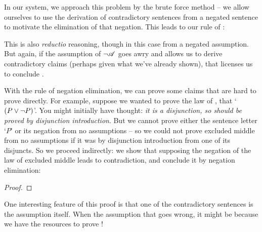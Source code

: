 In our system, we approach this problem by the brute force method – we allow ourselves to use the derivation of contradictory sentences from a negated sentence to motivate the elimination of that negation. This leads to our rule of :

This is also \emph{reductio} reasoning, though in this case from a negated assumption. But again, if the assumption of $\neg \mathscr{A}$ goes awry and allows us to derive contradictory claims (perhaps given what we've already shown), that licenses us to conclude .

With the rule of negation elimination, we can prove some claims that are hard to prove directly. For example, suppose we wanted to prove the law of , that `$(P \vee \neg P)$'. You might initially have thought: \emph{it is a disjunction, so should be proved by disjunction introduction}. But we cannot prove either the sentence letter `$P$' or its negation from no assumptions – so we could not prove excluded middle from no assumptions if it was by disjunction introduction from one of its disjuncts. So we proceed indirectly: we show that supposing the negation of the law of excluded middle leads to contradiction, and conclude it by negation elimination: \begin{proof}
	\open {}
	\open
	\close
	\close
\end{proof}
One interesting feature of this proof is that one of the contradictory sentences is the assumption itself. When the assumption that \enot{} goes wrong, it might be because we have the resources to prove !


